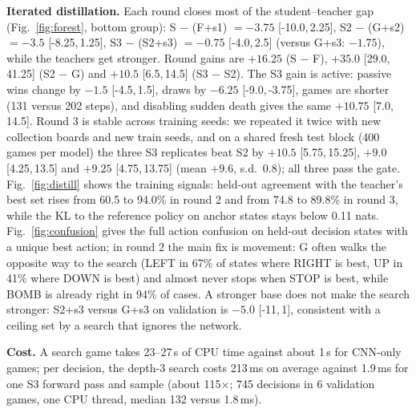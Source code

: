 \documentclass[11pt]{article}
\newcommand{\ci}[2]{[#1,\,#2]}
\newcommand{\searchms}{213}
\newcommand{\cnnms}{1.9}
\newcommand{\speedratio}{115}
\begin{document}
\textbf{Iterated distillation.} Each round closes most of the student--teacher gap (Fig.~\ref{fig:forest}, bottom group): S $-$ (F+s1) $=-3.75$ \ci{-10.0}{2.25}, S2 $-$ (G+s2) $=-3.5$ \ci{-8.25}{1.25}, S3 $-$ (S2+s3) $=-0.75$ \ci{-4.0}{2.5} (versus G+s3: $-1.75$), while the teachers get stronger. Round gains are $+16.25$ (S $-$ F), $+35.0$ \ci{29.0}{41.25} (S2 $-$ G) and $+10.5$ \ci{6.5}{14.5} (S3 $-$ S2). The S3 gain is active: passive wins change by $-1.5$ \ci{-4.5}{1.5}, draws by $-6.25$ \ci{-9.0}{-3.75}, games are shorter (131 versus 202 steps), and disabling sudden death gives the same $+10.75$ \ci{7.0}{14.5}. Round 3 is stable across training seeds: we repeated it twice with new collection boards and new train seeds, and on a shared fresh test block (400 games per model) the three S3 replicates beat S2 by $+10.5$ \ci{5.75}{15.25}, $+9.0$ \ci{4.25}{13.5} and $+9.25$ \ci{4.75}{13.75} (mean $+9.6$, s.d.\ 0.8); all three pass the gate. Fig.~\ref{fig:distill} shows the training signals: held-out agreement with the teacher's best set rises from 60.5 to 94.0\% in round 2 and from 74.8 to 89.8\% in round 3, while the KL to the reference policy on anchor states stays below 0.11 nats. Fig.~\ref{fig:confusion} gives the full action confusion on held-out decision states with a unique best action; in round 2 the main fix is movement: G often walks the opposite way to the search (LEFT in 67\% of states where RIGHT is best, UP in 41\% where DOWN is best) and almost never stops when STOP is best, while BOMB is already right in 94\% of cases. A stronger base does not make the search stronger: S2+s3 versus G+s3 on validation is $-5.0$ \ci{-11}{1}, consistent with a ceiling set by a search that ignores the network.

\textbf{Cost.} A search game takes 23--27\,s of CPU time against about 1\,s for CNN-only games; per decision, the depth-3 search costs \searchms{}\,ms on average against \cnnms{}\,ms for one S3 forward pass and sample (about \speedratio{}$\times$; 745 decisions in 6 validation games, one CPU thread, median 132 versus 1.8\,ms).
\end{document}
